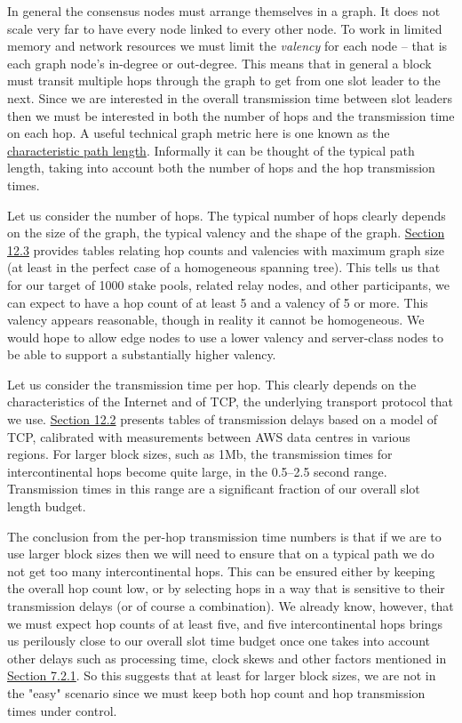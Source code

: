 \documentclass[]{article}
\begin{document}
In general the consensus nodes must arrange themselves in a graph. It
does not scale very far to have every node linked to every other node.
To work in limited memory and network resources we must limit the
\emph{valency} for each node -- that is each graph node's in-degree or
out-degree. This means that in general a block must transit multiple
hops through the graph to get from one slot leader to the next. Since we
are interested in the overall transmission time between slot leaders
then we must be interested in both the number of hops and the
transmission time on each hop. A useful technical graph metric here is
one known as the \protect\hyperlink{rm0n4bczhl67}{{characteristic path
length}}. Informally it can be thought of the typical path length,
taking into account both the number of hops and the hop transmission
times.

Let us consider the number of hops. The typical number of hops clearly
depends on the size of the graph, the typical valency and the shape of
the graph. \protect\hyperlink{model-of-network-scaling}{Section 12.3}
provides tables relating hop counts and valencies with maximum graph
size (at least in the perfect case of a homogeneous spanning tree). This
tells us that for our target of 1000 stake pools, related relay nodes,
and other participants, we can expect to have a hop count of at least 5
and a valency of 5 or more. This valency appears reasonable, though in
reality it cannot be homogeneous. We would hope to allow edge nodes to
use a lower valency and server-class nodes to be able to support a
substantially higher valency.

Let us consider the transmission time per hop. This clearly depends on
the characteristics of the Internet and of TCP, the underlying transport
protocol that we use.
\protect\hyperlink{tcp-rpc-response-behavior}{{Section 12.2}} presents
tables of transmission delays based on a model of TCP, calibrated with
measurements between AWS data centres in various regions. For larger
block sizes, such as 1Mb, the transmission times for intercontinental
hops become quite large, in the 0.5--2.5 second range. Transmission
times in this range are a significant fraction of our overall slot
length budget.

The conclusion from the per-hop transmission time numbers is that if we
are to use larger block sizes then we will need to ensure that on a
typical path we do not get too many intercontinental hops. This can be
ensured either by keeping the overall hop count low, or by selecting
hops in a way that is sensitive to their transmission delays (or of
course a combination). We already know, however, that we must expect hop
counts of at least five, and five intercontinental hops brings us
perilously close to our overall slot time budget once one takes into
account other delays such as processing time, clock skews and other
factors mentioned in \protect\hyperlink{timeliness-constraint}{{Section
7.2.1}}. So this suggests that at least for larger block sizes, we are
not in the "easy" scenario since we must keep both hop count and hop
transmission times under control.
\end{document}
